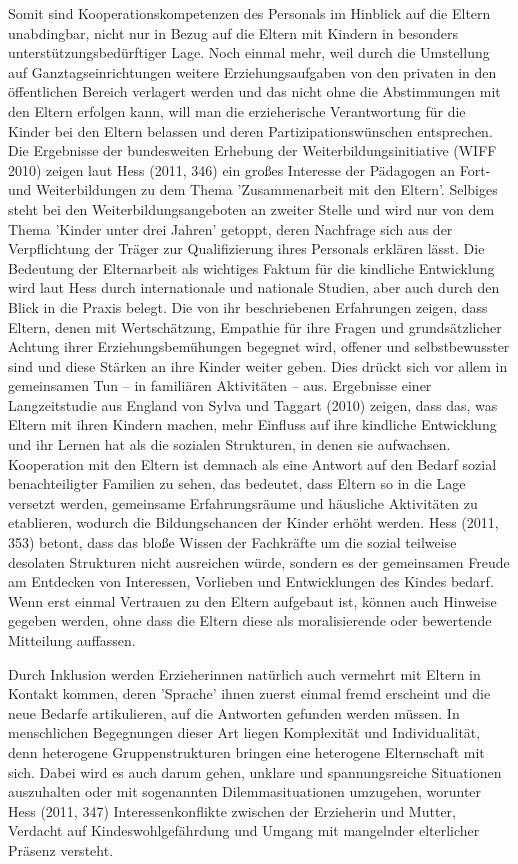 Somit sind Kooperationskompetenzen des Personals im Hinblick auf die Eltern unabdingbar, nicht nur in Bezug auf die Eltern mit Kindern in besonders unterstützungsbedürftiger Lage. 
Noch einmal mehr, weil durch die Umstellung auf Ganztagseinrichtungen weitere Erziehungsaufgaben von den privaten in den öffentlichen Bereich verlagert werden und das nicht ohne die Abstimmungen mit den Eltern erfolgen kann, will man die erzieherische Verantwortung für die Kinder bei den Eltern belassen und deren Partizipationswünschen entsprechen. Die Ergebnisse der bundesweiten Erhebung der Weiterbildungsinitiative (WIFF 2010) zeigen laut Hess (2011, 346) ein großes Interesse der Pädagogen an Fort- und Weiterbildungen zu dem Thema 'Zusammenarbeit mit den Eltern'. Selbiges steht bei den Weiterbildungsangeboten an zweiter Stelle und wird nur von dem Thema 'Kinder unter drei Jahren' getoppt, deren Nachfrage sich aus der Verpflichtung der Träger zur Qualifizierung ihres Personals erklären lässt. Die Bedeutung der Elternarbeit als wichtiges Faktum für die kindliche Entwicklung wird  laut Hess durch internationale und nationale Studien, aber auch durch den Blick in die Praxis belegt. Die von ihr beschriebenen Erfahrungen zeigen, dass Eltern, denen mit Wertschätzung, Empathie für ihre Fragen und grundsätzlicher Achtung ihrer Erziehungsbemühungen begegnet wird, offener und selbstbewusster sind und diese Stärken an ihre Kinder weiter geben. Dies drückt sich vor allem in gemeinsamen Tun -- in familiären Aktivitäten -- aus. 
Ergebnisse einer Langzeitstudie aus England von Sylva und Taggart (2010) zeigen, dass das, was Eltern mit ihren Kindern machen, mehr Einfluss auf ihre kindliche Entwicklung und ihr Lernen hat als die sozialen Strukturen, in denen sie aufwachsen.  
Kooperation mit den Eltern ist demnach als eine Antwort auf den Bedarf sozial benachteiligter Familien zu sehen, das bedeutet, dass Eltern so in die Lage versetzt werden, gemeinsame Erfahrungsräume und häusliche Aktivitäten zu etablieren, wodurch die Bildungschancen der Kinder erhöht werden. Hess (2011, 353) betont, dass das bloße Wissen der Fachkräfte um die sozial teilweise desolaten Strukturen nicht ausreichen würde, sondern es der gemeinsamen Freude am Entdecken von Interessen, Vorlieben und Entwicklungen des Kindes bedarf. Wenn erst einmal Vertrauen zu den Eltern aufgebaut ist, können auch Hinweise gegeben werden, ohne dass die Eltern diese als moralisierende oder bewertende Mitteilung auffassen.

Durch Inklusion werden Erzieherinnen natürlich auch vermehrt mit Eltern in Kontakt kommen, deren 'Sprache' ihnen zuerst einmal fremd erscheint und die neue Bedarfe artikulieren, auf die Antworten gefunden werden müssen. In menschlichen Begegnungen dieser Art liegen Komplexität und Individualität, denn heterogene Gruppenstrukturen bringen eine heterogene Elternschaft mit sich. Dabei wird es auch darum gehen, unklare und spannungsreiche Situationen auszuhalten oder mit sogenannten Dilemmasituationen umzugehen, worunter Hess (2011, 347) Interessenkonflikte zwischen der Erzieherin und Mutter, Verdacht auf Kindeswohlgefährdung und Umgang mit mangelnder elterlicher Präsenz versteht. 

